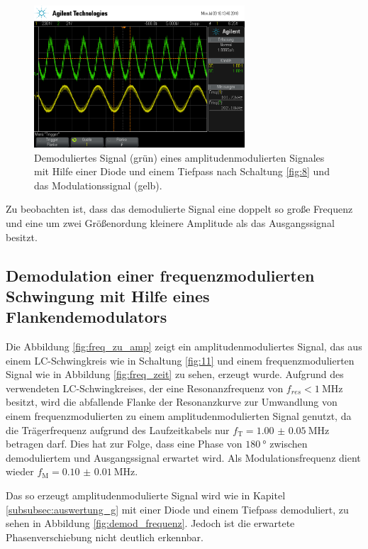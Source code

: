 \begin{figure}
  \centering
  \includegraphics[width=0.7\textwidth]{osci/amp_demod_diode.png}
  \caption{Demoduliertes Signal (grün) eines amplitudenmodulierten Signales mit Hilfe einer
  Diode und einem Tiefpass nach Schaltung \ref{fig:8} und das Modulationssignal (gelb).}
\label{fig:diode_demod_amp}
\end{figure}

Zu beobachten ist, dass das demodulierte Signal eine doppelt so große Frequenz
und eine um zwei Größenordung kleinere Amplitude als das Ausgangssignal
besitzt.
\FloatBarrier
\subsection{Demodulation einer frequenzmodulierten Schwingung
mit Hilfe eines Flankendemodulators}
\label{subsec:auswertung_h}
Die Abbildung \ref{fig:freq_zu_amp}
zeigt ein amplitudenmoduliertes Signal, das aus einem LC-Schwingkreis
wie in Schaltung \ref{fig:11} und einem frequenzmodulierten Signal wie in Abbildung
\ref{fig:freq_zeit} zu sehen, erzeugt wurde.
Aufgrund des verwendeten LC-Schwingkreises, der eine Resonanzfrequenz von $f_{res}< \SI{1}{\mega\hertz}$ besitzt,
wird die abfallende Flanke der Resonanzkurve zur Umwandlung von einem
frequenzmodulierten zu einem amplitudenmodulierten Signal genutzt,
da die Trägerfrequenz
aufgrund des Laufzeitkabels nur $f_{\text{T}}=\SI{1.00(5)}{\mega\hertz}$ betragen darf.
Dies hat zur Folge, dass eine Phase von $\SI{180}{\degree}$ zwischen demoduliertem und Ausgangssignal
erwartet wird.
Als Modulationsfrequenz dient wieder $f_{\text{M}}=\SI{0.10(1)}{\mega\hertz}$.

Das so erzeugt amplitudenmodulierte Signal wird wie in Kapitel \ref{subsubsec:auswertung_g}
mit einer Diode und einem Tiefpass demoduliert, zu sehen in Abbildung \ref{fig:demod_frequenz}.
Jedoch ist die erwartete Phasenverschiebung nicht deutlich erkennbar.


